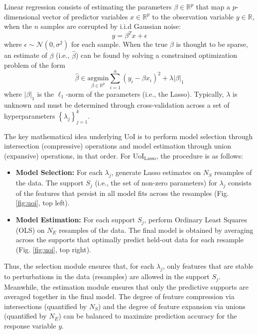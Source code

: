 \documentclass[letterpaper, 10 pt, conference]{ieeeconf}  %
\begin{document}
Linear regression consists of estimating the parameters $\beta \in \mathbb{R}^p$ that map a $p$-dimensional vector of predictor variables $x \in \mathbb{R}^p$ to the observation variable $y\in \mathbb{R}$, when the $n$ samples are corrupted by i.i.d Gaussian noise:
$$
y = \beta^T x + \epsilon
$$
where $\epsilon \sim \mathcal{N}(0, \sigma^2)$ for each sample. When the true $\beta$ is thought to be sparse, an estimate of $\beta$ (i.e., $\hat{\beta}$) can be found by solving a constrained optimization problem of the form
$$
\hat{\beta} \in \underset{\beta\in \mathbb{R}^p}{\text{argmin}} \sum_{i=1}^n(y_i - \beta x_i)^2 + \lambda |\beta|_1
$$
where $|\beta|_1$ is the $\ell_1$-norm of the parameters (i.e., the Lasso). Typically, $\lambda$ is unknown and must be determined through cross-validation across a set of hyperparameters $\left\{\lambda_j\right\}_{j=1}^k$.

The key mathematical idea underlying UoI is to perform
model selection through intersection (compressive) operations and model estimation through union (expansive) operations, in that order. For UoI$_{\text{Lasso}}$, the procedure is as follows:
\begin{itemize}
    \item \textbf{Model Selection:} For each $\lambda_j$, generate Lasso estimates on $N_S$ resamples of the data. The support $S_j$ (i.e., the set of non-zero parameters) for $\lambda_j$ consists of the features that persist in all model fits across the resamples (Fig. \ref{fig:uoi}, top left).
    \item \textbf{Model Estimation:} For each support $S_j$, perform Ordinary Least Squares (OLS) on $N_E$ resamples of the data. The final model is obtained by averaging across the supports that optimally predict held-out data for each resample (Fig. \ref{fig:uoi}, top right). 
\end{itemize}
Thus, the selection module ensures that, for each $\lambda_j$, only features that are stable to perturbations in the data (resamples) are allowed in the support $S_j$. Meanwhile, the estimation module ensures that only the predictive supports are averaged together in the final model. The degree of feature compression via intersections (quantified by $N_S$) and the degree of feature expansion via unions (quantified by $N_E$) can be balanced to maximize prediction accuracy for the response variable $y$.
\end{document}
